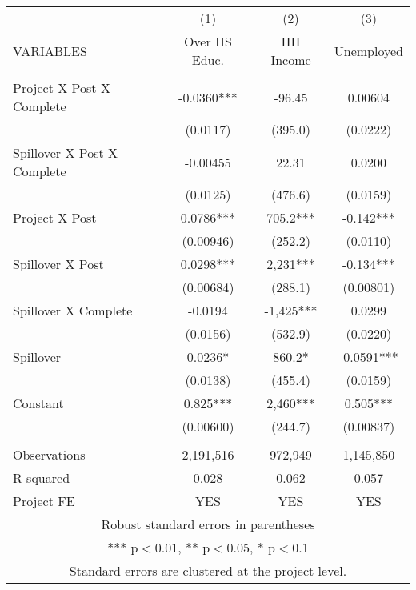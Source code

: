 \begin{tabular}{lccc} \hline
 & (1) & (2) & (3) \\
VARIABLES & Over HS Educ. & HH Income & Unemployed \\ \hline
 &  &  &  \\
Project X Post X Complete & -0.0360*** & -96.45 & 0.00604 \\
 & (0.0117) & (395.0) & (0.0222) \\
Spillover X Post X Complete & -0.00455 & 22.31 & 0.0200 \\
 & (0.0125) & (476.6) & (0.0159) \\
Project X Post & 0.0786*** & 705.2*** & -0.142*** \\
 & (0.00946) & (252.2) & (0.0110) \\
Spillover X Post & 0.0298*** & 2,231*** & -0.134*** \\
 & (0.00684) & (288.1) & (0.00801) \\
Spillover X Complete & -0.0194 & -1,425*** & 0.0299 \\
 & (0.0156) & (532.9) & (0.0220) \\
Spillover & 0.0236* & 860.2* & -0.0591*** \\
 & (0.0138) & (455.4) & (0.0159) \\
Constant & 0.825*** & 2,460*** & 0.505*** \\
 & (0.00600) & (244.7) & (0.00837) \\
 &  &  &  \\
Observations & 2,191,516 & 972,949 & 1,145,850 \\
R-squared & 0.028 & 0.062 & 0.057 \\
 Project FE & YES & YES & YES \\ \hline
\multicolumn{4}{c}{ Robust standard errors in parentheses} \\
\multicolumn{4}{c}{ *** p$<$0.01, ** p$<$0.05, * p$<$0.1} \\
\multicolumn{4}{c}{ Standard errors are clustered at the project level.} \\
\end{tabular}
